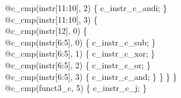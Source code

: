 {\indent \hspace{\parindent} \hspace{\parindent} \hspace{\parindent} @c\_cmp(instr[11:10], 2) \{ c\_instr\_c\_andi; \}\\%
\indent \hspace{\parindent} \hspace{\parindent} \hspace{\parindent} @c\_cmp(instr[11:10], 3) \{\\%
\indent \hspace{\parindent} \hspace{\parindent} \hspace{\parindent} \hspace{\parindent} @c\_cmp(instr[12], 0) \{\\%
\indent \hspace{\parindent} \hspace{\parindent} \hspace{\parindent} \hspace{\parindent} \hspace{\parindent} @c\_cmp(instr[6:5], 0) \{ c\_instr\_c\_sub; \}\\%
\indent \hspace{\parindent} \hspace{\parindent} \hspace{\parindent} \hspace{\parindent} \hspace{\parindent} @c\_cmp(instr[6:5], 1) \{ c\_instr\_c\_xor; \}\\%
\indent \hspace{\parindent} \hspace{\parindent} \hspace{\parindent} \hspace{\parindent} \hspace{\parindent} @c\_cmp(instr[6:5], 2) \{ c\_instr\_c\_or; \}\\%
\indent \hspace{\parindent} \hspace{\parindent} \hspace{\parindent} \hspace{\parindent} \hspace{\parindent} @c\_cmp(instr[6:5], 3) \{ c\_instr\_c\_and; \} \} \} \}\\%
\indent \hspace{\parindent} \hspace{\parindent} @c\_cmp(funct3\_c, 5) \{ c\_instr\_c\_j; \}\\%
}

